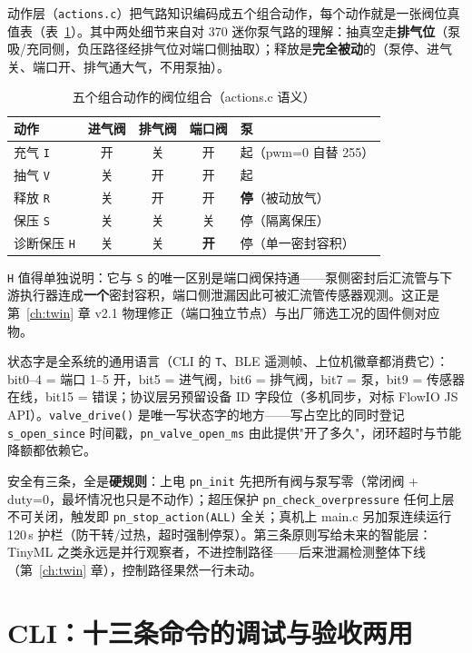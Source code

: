 动作层（\texttt{actions.c}）把气路知识编码成五个组合动作，每个动作就是一张阀位真值表（表~\ref{tab:fw-actions}）。其中两处细节来自对 370 迷你泵气路的理解：抽真空走\textbf{排气位}（泵吸/充同侧，负压路径经排气位对端口侧抽取）；释放是\textbf{完全被动}的（泵停、进气关、端口开、排气通大气，不用泵抽）。

\begin{table}[htbp]
  \centering
  \caption{五个组合动作的阀位组合（actions.c 语义）}
  \label{tab:fw-actions}
  \begin{tabular}{lcccl}
    \toprule
    动作 & 进气阀 & 排气阀 & 端口阀 & 泵 \\
    \midrule
    充气 \texttt{I} & 开 & 关 & 开 & 起（pwm=0 自替 255） \\
    抽气 \texttt{V} & 关 & 开 & 开 & 起 \\
    释放 \texttt{R} & 关 & 开 & 开 & \textbf{停}（被动放气） \\
    保压 \texttt{S} & 关 & 关 & 关 & 停（隔离保压） \\
    诊断保压 \texttt{H} & 关 & 关 & \textbf{开} & 停（单一密封容积） \\
    \bottomrule
  \end{tabular}
\end{table}

\texttt{H} 值得单独说明：它与 \texttt{S} 的唯一区别是端口阀保持通——泵侧密封后汇流管与下游执行器连成\textbf{一个}密封容积，端口侧泄漏因此可被汇流管传感器观测。这正是第~\ref{ch:twin} 章 v2.1 物理修正（端口独立节点）与出厂筛选工况的固件侧对应物。

状态字是全系统的通用语言（CLI 的 \texttt{T}、BLE 遥测帧、上位机徽章都消费它）：bit0--4 = 端口 1--5 开，bit5 = 进气阀，bit6 = 排气阀，bit7 = 泵，bit9 = 传感器在线，bit15 = 错误；协议层另预留设备 ID 字段位（多机同步，对标 FlowIO JS API）。\texttt{valve\_drive()} 是唯一写状态字的地方——写占空比的同时登记 \texttt{s\_open\_since} 时间戳，\texttt{pn\_valve\_open\_ms} 由此提供"开了多久"，闭环超时与节能降额都依赖它。

安全有三条，全是\textbf{硬规则}：上电 \texttt{pn\_init} 先把所有阀与泵写零（常闭阀 + duty=0，最坏情况也只是不动作）；超压保护 \texttt{pn\_check\_overpressure} 任何上层不可关闭，触发即 \texttt{pn\_stop\_action(ALL)} 全关；真机上 main.c 另加泵连续运行 120\,s 护栏（防干转/过热，超时强制停泵）。第三条原则写给未来的智能层：TinyML 之类永远是并行观察者，不进控制路径——后来泄漏检测整体下线（第~\ref{ch:twin} 章），控制路径果然一行未动。

\section{CLI：十三条命令的调试与验收两用}
\label{sec:fw-cli}

